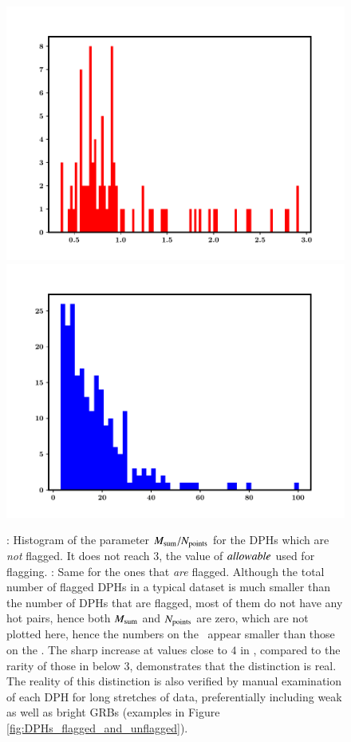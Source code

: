 \begin{figure}
\begin{center}
\includegraphics[scale=0.42]{GRB160802A--Q0--not_flagged}
\includegraphics[scale=0.42]{GRB160802A--Q0--flagged}
\end{center}
\caption[Histograms of the parameter $\M / \N$]{\eL: Histogram of the parameter $\M / \N$ for the DPHs which are \emph{not} flagged. It does not reach $3$, the value of $allowable$ used for flagging. \eR: Same for the ones that \emph{are} flagged. Although the total number of flagged DPHs in a typical dataset is much smaller than the number of DPHs that are flagged, most of them do not have any hot pairs, hence both $M_{\rm{sum}}$ and $N_{\rm{points}}$ are zero, which are not plotted here, hence the numbers on the \eL\ appear smaller than those on the \eR. The sharp increase at values close to $4$ in \eR, compared to the rarity of those in \eL below $3$, demonstrates that the distinction is real. The reality of this distinction is also verified by manual examination of each DPH for long stretches of data, preferentially including weak as well as bright GRBs (examples in Figure \ref{fig:DPHs_flagged_and_unflagged}).
\label{fig:robustness_of_allowable=3}}
\end{figure}

